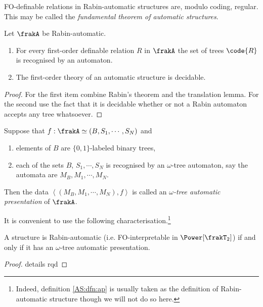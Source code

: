 FO-definable relations in Rabin-automatic structures are, modulo coding, regular. 
This may be called the {\em fundamental theorem of automatic structures}.

\begin{theorem}
Let $\frakA$ be Rabin-automatic.
\begin{enumerate}
\item For every first-order definable relation $R$ in $\frakA$ the set of trees $\code{R}$ is recognised by an automaton.
\item The first-order theory of an automatic structure is decidable.
\end{enumerate}
\end{theorem}

\begin{proof}
 For the first item combine Rabin's theorem and the translation lemma.
 For the second use the fact that it is decidable whether or not a Rabin automaton accepts any tree whatsoever.
\end{proof}

\begin{definition} \label{AS:dfn:ap}
Suppose that $f: \frakA \simeq  (B,S_1,\cdots,S_N)$ and
\begin{enumerate}
\item elements of $B$ are $\{0,1\}$-labeled binary trees,
\item each of the sets $B$, $S_1, \cdots, S_N$ is recognised by an $\omega$-tree automaton, say the automata are $M_B,M_1, \cdots, M_N$.
\end{enumerate}
Then the data $\left<(M_B,M_1,\cdots,M_N), f \right>$ is called an {\em $\omega$-tree automatic presentation} of $\frakA$.
\end{definition}

It is convenient to use the following characterisation.\footnote{Indeed,
definition \ref{AS:dfn:ap} is usually taken as the definition of
Rabin-automatic structure though we will not do so here.} 


\begin{theorem}
A structure is Rabin-automatic (i.e. FO-interpretable in $\Power[\frakT_2]$) if and only if it has an $\omega$-tree automatic presentation.
\end{theorem}

\begin{proof}
details rqd
\end{proof}

